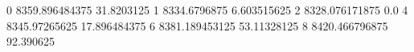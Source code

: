 0 8359.896484375 31.8203125
1 8334.6796875 6.603515625
2 8328.076171875 0.0
4 8345.97265625 17.896484375
6 8381.189453125 53.11328125
8 8420.466796875 92.390625
